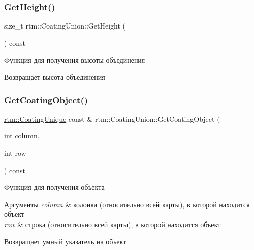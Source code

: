 \subsubsection{\texorpdfstring{Get\+Height()}{GetHeight()}}
{\footnotesize\ttfamily size\+\_\+t rtm\+::\+Coating\+Union\+::\+Get\+Height (\begin{DoxyParamCaption}{ }\end{DoxyParamCaption}) const}

Функция для получения высоты объединения \begin{DoxyReturn}{Возвращает}
высота объединения 
\end{DoxyReturn}
\mbox{\label{classrtm_1_1_coating_union_acbcdbbd157f6d55597a54bb639a977f2}} 
\subsubsection{\texorpdfstring{Get\+Coating\+Object()}{GetCoatingObject()}}
{\footnotesize\ttfamily \hyperlink{namespacertm_ab0ec616a26920aeaf720d04e041e8ce3}{rtm\+::\+Coating\+Unique} const  \& rtm\+::\+Coating\+Union\+::\+Get\+Coating\+Object (\begin{DoxyParamCaption}\item[{int}]{column,  }\item[{int}]{row }\end{DoxyParamCaption}) const}

Функция для получения объекта 
\begin{DoxyParams}{Аргументы}
{\em column} & колонка (относительно всей карты), в которой находится объект \\
\hline
{\em row} & строка (относительно всей карты), в которой находится объект \\
\hline
\end{DoxyParams}
\begin{DoxyReturn}{Возвращает}
умный указатель на объект 
\end{DoxyReturn}
\mbox{\label{classrtm_1_1_coating_union_adf3ec4f4e8399c455aaa73bfe726b4ce}} 
